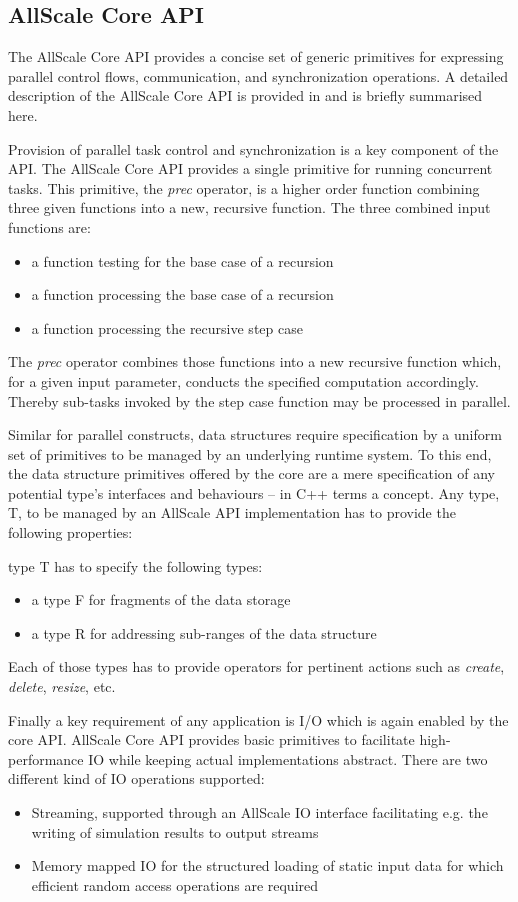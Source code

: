 \documentclass[acmsmall,review,anonymous]{acmart}\settopmatter{printfolios=true,printccs=false,printacmref=false}
\begin{document}
\subsection{AllScale Core API}
The AllScale Core API provides a concise set of generic primitives for expressing
parallel control flows, communication, and synchronization operations. A detailed description of the AllScale Core API is provided in \cite{allscale_architecure_2017} and is briefly summarised here.

Provision of parallel task control and synchronization is a key component of the API.
The AllScale Core API provides a single primitive for running concurrent tasks.
This primitive, the \textit{prec} operator, is a higher order function combining three
given functions into a new, recursive function. The three combined input
functions are:
\begin{itemize}
\item a function testing for the base case of a recursion
\item a function processing the base case of a recursion
\item a function processing the recursive step case
\end{itemize}
The \textit{prec} operator combines those functions into a new recursive function which,
for a given input parameter, conducts the specified computation accordingly.
Thereby sub-tasks invoked by the step case function may be processed in
parallel.


Similar for parallel constructs, data structures require specification by a uniform set of primitives to be managed by an underlying runtime system. 
To this end, the data structure primitives offered by the core are a mere
specification of any potential type's interfaces and behaviours -- in C++ terms a
concept. Any type, T, to be managed by an AllScale API implementation has to
provide the following properties:

type T has to specify the following types:
\begin{itemize}
\item a type F for fragments of the data storage
\item a type R for addressing sub-ranges of the data structure
 \end{itemize}

Each of those types has to provide operators for pertinent actions such as \textit{create}, \textit{delete}, \textit{resize}, etc.

Finally a key requirement of any application is I/O which is again enabled by the core API. AllScale Core API provides basic primitives
to facilitate high-performance IO while keeping actual implementations abstract.
There are two different kind of IO operations supported:
\begin{itemize}
\item Streaming, supported through an AllScale IO interface facilitating e.g. the writing of simulation results to output streams
\item Memory mapped IO for the structured loading of static input data for which efficient random access operations are required
\end{itemize}
\end{document}
